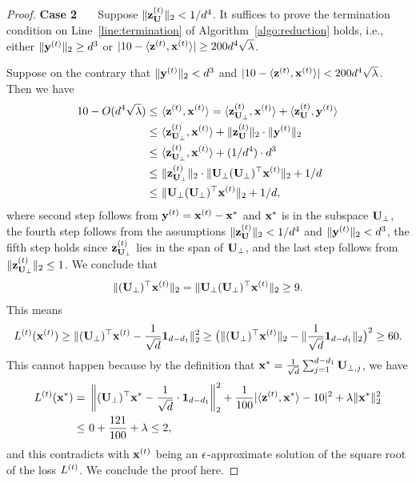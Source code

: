 \begin{proof}
\vspace{+2mm}
{\bf \noindent Case 2 \ \ } Suppose $\|\mathbf{z}_{\mathbf{U}}^{(t)}\|_2 <  1/d^4$. It suffices to prove the termination condition on Line~\ref{line:termination} of Algorithm~\ref{algo:reduction} holds, i.e., either $\|\mathbf{y}^{(t)}\|_2 \geq d^3$ or $|10 - \langle \mathbf{z}^{(t)}, \mathbf{x}^{(t)}\rangle | \geq 200 d^4\sqrt{\lambda}$. 

Suppose on the contrary that $\|\mathbf{y}^{(t)}\|_2 < d^3$ and $|10 - \langle \mathbf{z}^{(t)}, \mathbf{x}^{(t)}\rangle | < 200 d^4\sqrt{\lambda}$. Then we have
\begin{align*}
10 - O(d^4 \sqrt{\lambda}) \leq  &~ \langle \mathbf{z}^{(t)} , \mathbf{x}^{(t)}\rangle =  \langle \mathbf{z}_{\mathbf{U}_\perp}^{(t)} , \mathbf{x}^{(t)}\rangle + \langle \mathbf{z}_{\mathbf{U}}^{(t)}, \mathbf{y}^{(t)} \rangle\\
\leq &~ \langle \mathbf{z}_{\mathbf{U}_\perp}^{(t)} , \mathbf{x}^{(t)}\rangle + \|\mathbf{z}_{\mathbf{U}}^{(t)}\|_2 \cdot \| \mathbf{y}^{(t)} \|_2 \\
\leq &~ \langle \mathbf{z}_{\mathbf{U}_\perp}^{(t)} , \mathbf{x}^{(t)}\rangle + (1/d^4) \cdot d^3 \\
\leq &~ \|\mathbf{z}_{\mathbf{U}_\perp}^{(t)}\|_2 \cdot \|\mathbf{U}_\perp (\mathbf{U}_\perp)^\top\mathbf{x}^{(t)} \|_2 + 1/d \\
\leq &~ \|\mathbf{U}_\perp (\mathbf{U}_\perp)^\top\mathbf{x}^{(t)} \|_2 + 1/d,
\end{align*}
where second step follows from $\mathbf{y}^{(t)} = \mathbf{x}^{(t)} - \mathbf{x}^*$ and $\mathbf{x}^*$ is in the subspace $\mathbf{U}_{\perp}$, the fourth step follows from the assumptions $\|\mathbf{z}_{\mathbf{U}}^{(t)}\|_2 <  1/d^4$ and $\|\mathbf{y}^{(t)}\|_2 < d^3$, the fifth step holds since $\mathbf{z}_{\mathbf{U}_\perp}^{(t)}$ lies in the span of $\mathbf{U}_\perp$, and the last step follows from $\|\mathbf{z}_{\mathbf{U}_\perp}^{(t)}\|_2 \leq 1$. We conclude that 
\begin{align*}
\|(\mathbf{U}_\perp)^{\top}\mathbf{x}^{(t)}\|_2 = \|\mathbf{U}_\perp(\mathbf{U}_\perp)^{\top}\mathbf{x}^{(t)}\|_2  \geq 9.
\end{align*}
This means 
\[
L^{(t)}(\mathbf{x}^{(t)}) \geq \|(\mathbf{U}_\perp)^\top \mathbf{x}^{(t)} - \frac{1}{\sqrt{d}}\mathbf{1}_{d-d_1}\|^2_2 \geq \big(\|(\mathbf{U}_\perp)^{\top}\mathbf{x}^{(t)}\|_2 - \|\frac{1}{\sqrt{d}}\mathbf{1}_{d-d_1}\|_2\big)^2 \geq 60.
\] 
This cannot happen because by the definition that $\mathbf{x}^{*} = \frac{1}{\sqrt{d}} \sum_{j=1}^{d-d_1}\mathbf{U}_{\perp,j}$, we have
\begin{align*}
L^{(t)}(\mathbf{x}^{*}) = &~ \left\|(\mathbf{U}_\perp)^{\top}\mathbf{x}^{*} - \frac{1}{\sqrt{d}} \cdot \mathbf{1}_{d-d_1}\right\|_2^2 + \frac{1}{100}|\langle \mathbf{z}^{(t)}, \mathbf{x}^{*}\rangle - 10|^2 + \lambda \|\mathbf{x}^{*}\|_2^2 \\
\leq &~ 0 + \frac{121}{100} +  \lambda \leq 2,
\end{align*}
and this contradicts with $\mathbf{x}^{{(t)}}$ being an $\epsilon$-approximate solution of the square root of the loss $L^{(t)}$. We conclude the proof here.
\end{proof}


